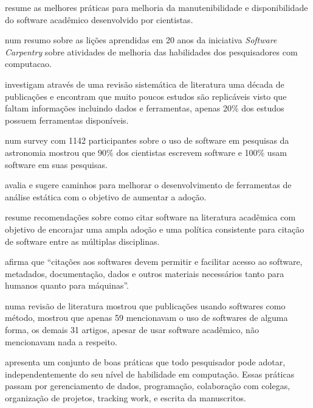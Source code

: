  resume as melhores práticas para melhoria da
manutenibilidade e disponibilidade do software acadêmico desenvolvido por
cientistas.

 num resumo sobre as lições aprendidas em 20
anos da iniciativa {\it Software Carpentry} sobre atividades de melhoria das
habilidades dos pesquisadores com computacao.

investigam através de uma revisão sistemática de literatura uma década de
publicações e encontram que muito poucos estudos são replicáveis visto que
faltam informações incluindo dados e ferramentas, apenas 20\% dos estudos
possuem ferramentas disponíveis.

num survey com 1142 participantes sobre o uso de software em pesquisas da
astronomia mostrou que 90\% dos cientistas escrevem software e 100\% usam
software em suas pesquisas.

 avalia e sugere caminhos para melhorar o
desenvolvimento de ferramentas de análise estática com o objetivo de aumentar a
adoção.

 resume recomendações sobre como citar software
na literatura acadêmica com objetivo de encorajar uma ampla adoção e uma
política consistente para citação de software entre as múltiplas disciplinas.

 afirma que ``citações aos softwares devem
permitir e facilitar acesso ao software, metadados, documentação, dados e
outros materiais necessários tanto para humanos quanto para máquinas''.

numa revisão de literatura mostrou que publicações usando softwares como
método, mostrou que apenas 59 mencionavam o uso de softwares de alguma forma,
os demais 31 artigos, apesar de usar software acadêmico, não mencionavam nada a
respeito.

 apresenta um conjunto de boas práticas que todo
pesquisador pode adotar, independentemente do seu nível de habilidade em
computação. Essas práticas passam por gerenciamento de dados, programação,
colaboração com colegas, organização de projetos, tracking work, e escrita da
manuscritos.


